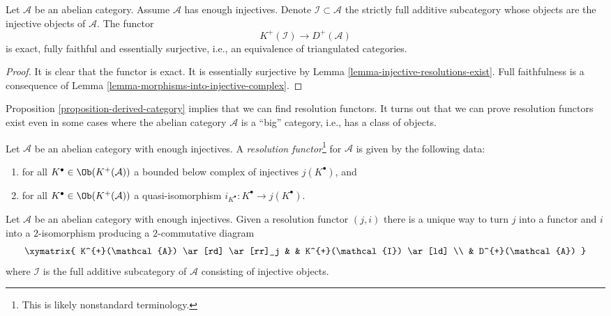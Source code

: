 \begin{proposition}
\label{proposition-derived-category}
Let $\mathcal{A}$ be an abelian category.
Assume $\mathcal{A}$ has enough injectives.
Denote $\mathcal{I} \subset \mathcal{A}$ the strictly full
additive subcategory whose objects are the injective objects of
$\mathcal{A}$.
The functor
$$
K^{+}(\mathcal{I}) \longrightarrow D^{+}(\mathcal{A})
$$
is exact, fully faithful and essentially surjective, i.e.,
an equivalence of triangulated categories.
\end{proposition}

\begin{proof}
It is clear that the functor is exact.
It is essentially surjective by
Lemma \ref{lemma-injective-resolutions-exist}.
Full faithfulness is a consequence of
Lemma \ref{lemma-morphisms-into-injective-complex}.
\end{proof}

\noindent
Proposition \ref{proposition-derived-category}
implies that we can find resolution functors.
It turns out that we can prove resolution functors exist
even in some cases where the abelian category $\mathcal{A}$ is
a ``big'' category, i.e., has a class of objects.

\begin{definition}
\label{definition-localization-functor}
Let $\mathcal{A}$ be an abelian category with enough injectives.
A {\it resolution functor}\footnote{This is likely nonstandard terminology.}
for $\mathcal{A}$ is given by the following data:
\begin{enumerate}
\item for all $K^\bullet \in \Ob(K^{+}(\mathcal{A}))$ a
bounded below complex of injectives $j(K^\bullet)$, and
\item for all $K^\bullet \in \Ob(K^{+}(\mathcal{A}))$ a
quasi-isomorphism $i_{K^\bullet} : K^\bullet \to j(K^\bullet)$.
\end{enumerate}
\end{definition}

\begin{lemma}
\label{lemma-resolution-functor}
Let $\mathcal{A}$ be an abelian category with enough injectives.
Given a resolution functor $(j, i)$ there is a unique way to
turn $j$ into a functor and $i$ into a $2$-isomorphism
producing a $2$-commutative diagram
$$
\xymatrix{
K^{+}(\mathcal{A}) \ar[rd] \ar[rr]_j & & K^{+}(\mathcal{I}) \ar[ld] \\
& D^{+}(\mathcal{A})
}
$$
where $\mathcal{I}$ is the full additive subcategory of $\mathcal{A}$
consisting of injective objects.
\end{lemma}

